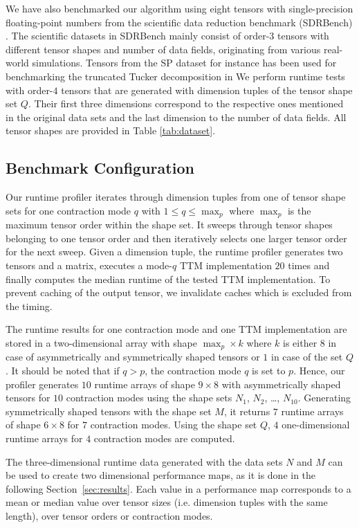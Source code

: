 We have also benchmarked our algorithm using eight tensors with single-precision floating-point numbers from the scientific data reduction benchmark (SDRBench) \cite{zhao:2020:sdrbench}.
The scientific datasets in SDRBench mainly consist of order-$3$ tensors with different tensor shapes and number of data fields, originating from various real-world simulations.
Tensors from the SP dataset for instance has been used for benchmarking the truncated Tucker decomposition in \cite{ballard:2020:tuckermpi}
We perform runtime tests with order-$4$ tensors that are generated with dimension tuples of the tensor shape set $Q$.
Their first three dimensions correspond to the respective ones mentioned in the original data sets and the last dimension to the number of data fields.
All tensor shapes are provided in Table \ref{tab:dataset}.


\subsection{Benchmark Configuration} 
Our runtime profiler iterates through dimension tuples from one of tensor shape sets for one contraction mode $q$ with $1 \leq q \leq \max_p$ where $\max_p$ is the maximum tensor order within the shape set.
It sweeps through tensor shapes belonging to one tensor order and then iteratively selects one larger tensor order for the next sweep.
Given a dimension tuple, the runtime profiler generates two tensors and a matrix, executes a mode-$q$ TTM implementation $20$ times and finally computes the median runtime of the tested TTM implementation.
To prevent caching of the output tensor, we invalidate caches which is excluded from the timing.
 
The runtime results for one contraction mode and one TTM implementation are stored in a two-dimensional array with shape $\max_p \times k$ where $k$ is either $8$ in case of asymmetrically and symmetrically shaped tensors or $1$ in case of the set $Q$.
It should be noted that if $q>p$, the contraction mode $q$ is set to $p$.
Hence, our profiler generates $10$ runtime arrays of shape $9\times 8$ with asymmetrically shaped tensors for $10$ contraction modes using the shape sets $N_1$, $N_2$, \dots, $N_{10}$.
Generating symmetrically shaped tensors with the shape set $M$, it returns $7$ runtime arrays of shape $6 \times 8$ for $7$ contraction modes.
Using the shape set $Q$, $4$ one-dimensional runtime arrays for $4$ contraction modes are computed.

The three-dimensional runtime data generated with the data sets $N$ and $M$ can be used to create two dimensional performance maps, as it is done in the following Section~\ref{sec:results}.
Each value in a performance map corresponds to a mean or median value over tensor sizes (i.e. dimension tuples with the same length), over tensor orders or contraction modes.
